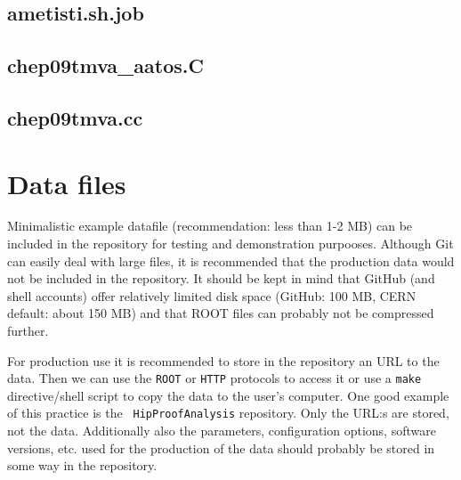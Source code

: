 \begin{appendix}
\subsection{ametisti.sh.job}
%

\subsection{chep09tmva\_aatos.C}
%

\subsection{chep09tmva.cc}
%

\section{Data files}
Minimalistic example datafile (recommendation: less than 1-2 MB) can
be included in the repository for testing and demonstration
purpooses. Although Git can easily deal with large files, it is
recommended that the production data would not be
included in the repository. It should be kept in mind that GitHub
(and shell accounts) offer relatively limited disk space (GitHub: 100
MB, CERN default: about 150 MB) and that ROOT files can probably not be
compressed further.

For production use it is recommended to store in the repository an URL
to the data. Then we can use the {\tt ROOT} or {\tt HTTP} protocols to
access it or use a {\tt make} directive/shell script to copy the data to the
user's computer. One good example of this practice is the {\tt
HipProofAnalysis} repository. Only the URL:s are stored, not the
data. Additionally also the parameters, configuration options,
software versions, etc. used for the production of the data should
probably be stored in some way in the repository.


\end{appendix}
